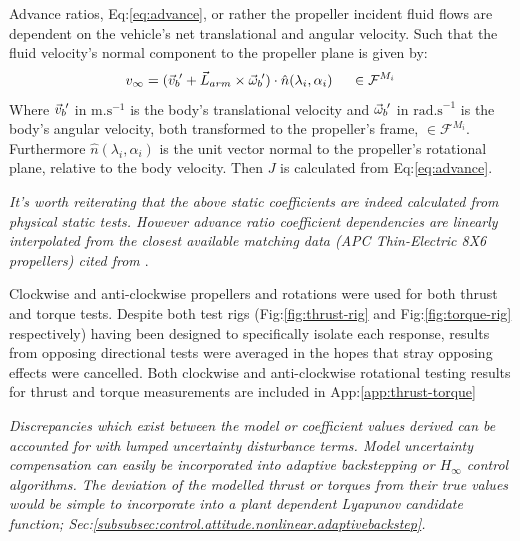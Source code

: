 \par
Advance ratios, Eq:\ref{eq:advance}, or rather the propeller incident fluid flows are dependent on the vehicle's net translational and angular velocity. Such that the fluid velocity's normal component to the propeller plane is given by:
\begin{equation}\label{eq:normal-fluid}
v_\infty = (\vec{v}_b\hspace{-1pt}' + \vec{L}_{arm}\times \vec{\omega}_b\hspace{-1pt}')\cdot \hat{n}(\lambda_i,\alpha_i)~~~~\in\mathcal{F}^{M_i}
\end{equation}
Where $\vec{v}_b\hspace{-1pt}'$ in $\text{m.s}^{-1}$ is the body's translational velocity and $\vec{\omega}_b\hspace{-1pt}'$ in $\text{rad.s}^{-1}$ is the body's angular velocity, both transformed to the propeller's frame, $\in\mathcal{F}^{M_i}$. Furthermore $\hat{n}(\lambda_i,\alpha_i)$ is the unit vector normal to the propeller's rotational plane, relative to the body velocity. Then $J$ is calculated from Eq:\ref{eq:advance}.
\par
{\color{Gray}\emph{It's worth reiterating that the above static coefficients are indeed calculated from physical static tests. However advance ratio coefficient dependencies are linearly interpolated from the closest available matching data (APC Thin-Electric 8X6 propellers) cited from \cite{UIUC}}.}
\par
Clockwise and anti-clockwise propellers and rotations were used for both thrust and torque tests. Despite both test rigs  (Fig:\ref{fig:thrust-rig} and Fig:\ref{fig:torque-rig} respectively) having been designed to specifically isolate each response, results from opposing directional tests were averaged in the hopes that stray opposing effects were cancelled. Both clockwise and anti-clockwise rotational testing  results for thrust and torque measurements are included in App:\ref{app:thrust-torque}
\par
{\color{Gray}\emph{Discrepancies which exist between the model or coefficient values derived can be accounted for with lumped uncertainty disturbance terms. Model uncertainty compensation can easily be incorporated into adaptive backstepping or $H_\infty$ control algorithms. The deviation of the modelled thrust or torques from their true values would be simple to incorporate into a plant dependent Lyapunov candidate function; Sec:\ref{subsubsec:control.attitude.nonlinear.adaptivebackstep}.}}
